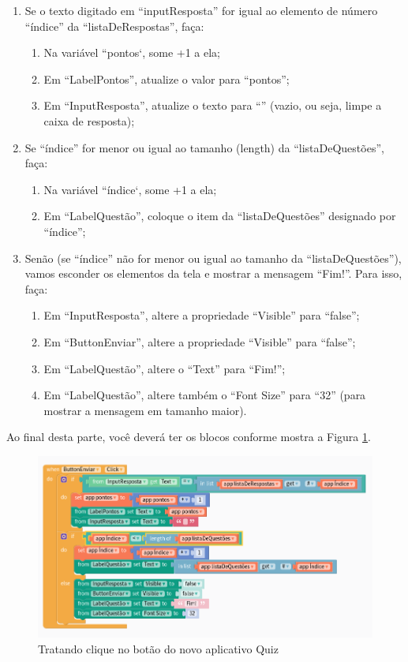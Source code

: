 \documentclass[11pt,fleqn]{book} %
\begin{document}
\begin{enumerate}
    \item Se o texto digitado em ``inputResposta'' for igual ao elemento de número ``índice'' da ``listaDeRespostas'', faça:
    \begin{enumerate}
        \item Na variável ``pontos`, some +1 a ela;
        \item Em ``LabelPontos'', atualize o valor para ``pontos'';
        \item Em ``InputResposta'', atualize o texto para ``'' (vazio, ou seja, limpe a caixa de resposta);
    \end{enumerate}
    \item Se ``índice'' for menor ou igual ao tamanho (length) da ``listaDeQuestões'', faça:
    \begin{enumerate}
        \item Na variável ``índice`, some +1 a ela;
        \item Em ``LabelQuestão'', coloque o item da ``listaDeQuestões'' designado por ``índice'';
    \end{enumerate}
    \item Senão (se ``índice'' não for menor ou igual ao tamanho da ``listaDeQuestões''), vamos esconder os elementos da tela e mostrar a mensagem ``Fim!''. Para isso, faça:
    \begin{enumerate}
        \item Em ``InputResposta'', altere a propriedade ``Visible'' para ``false'';
        \item Em ``ButtonEnviar'', altere a propriedade ``Visible'' para ``false'';
        \item Em ``LabelQuestão'', altere o ``Text'' para ``Fim!'';
        \item Em ``LabelQuestão'', altere também o ``Font Size'' para ``32'' (para mostrar a mensagem em tamanho maior).
    \end{enumerate}
\end{enumerate}



Ao final desta parte, você deverá ter os blocos conforme mostra a Figura \ref{fig:extraquizbutton}.


\begin{figure}[H]
	\centering
    \includegraphics[width=\textwidth]{Pictures/GuiaThunkExtraQuizButton.png}
    \caption{Tratando clique no botão do novo aplicativo Quiz}\label{fig:extraquizbutton}
\end{figure}
\end{document}
